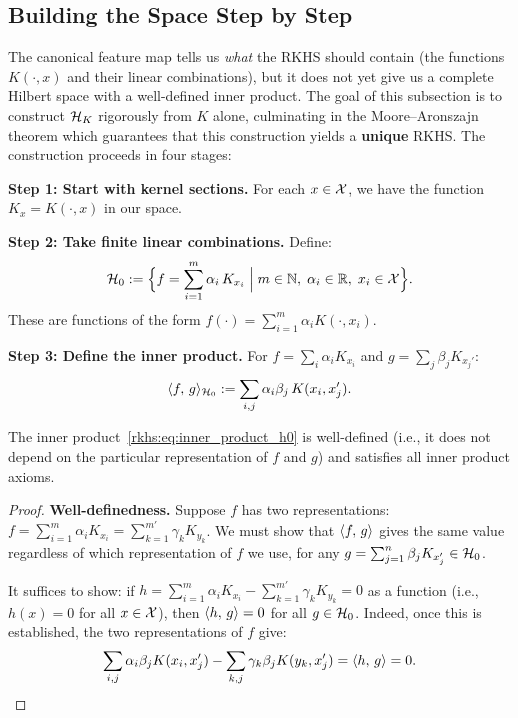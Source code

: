 \begin{notechapter}
\subsection{Building the Space Step by Step}
\label{rkhs:subsec:building_space}

The canonical feature map tells us \emph{what} the
RKHS should contain (the functions $K(\cdot, x)$ and
their linear combinations), but it does not yet give
us a complete Hilbert space with a well-defined inner
product. The goal of this subsection is to construct
$\mathcal{H}_K$ rigorously from $K$ alone, culminating in the
Moore--Aronszajn theorem which guarantees that this
construction yields a \textbf{unique} RKHS. The
construction proceeds in four stages:

\textbf{Step 1: Start with kernel sections.} For each $x \in \mathcal{X}$, we
have the function $K_x = K(\cdot, x)$ in our space.

\textbf{Step 2: Take finite linear combinations.} Define:
\[
\mathcal{H}_0 := \Bigl\{ f = \sum_{i=1}^m \alpha_i\, K_{x_i} \;\Big|\; m \in
\mathbb{N},\; \alpha_i \in \mathbb{R},\; x_i \in \mathcal{X} \Bigr\}.
\]
These are functions of the form $f(\cdot) = \sum_{i=1}^m \alpha_i
K(\cdot, x_i)$.

\textbf{Step 3: Define the inner product.} For $f = \sum_i \alpha_i
K_{x_i}$ and $g = \sum_j \beta_j K_{x_j'}$:
\begin{equation}
\label{rkhs:eq:inner_product_h0}
\langle f,\, g \rangle_{\mathcal{H}_0} := \sum_{i,j} \alpha_i \beta_j\, K(x_i, x_j').
\end{equation}

\begin{lemma}
\label{rkhs:lem:well_defined}
The inner product~\eqref{rkhs:eq:inner_product_h0} is well-defined (i.e., it
does not depend on the particular representation of $f$ and $g$) and
satisfies all inner product axioms.
\end{lemma}

\begin{proof}
\textbf{Well-definedness.} Suppose $f$ has two
representations:
$f = \sum_{i=1}^m \alpha_i K_{x_i}
   = \sum_{k=1}^{m'} \gamma_k K_{y_k}$.
We must show that $\langle f,\, g \rangle$ gives the same value
regardless of which representation of $f$ we use, for
any $g = \sum_{j=1}^n \beta_j K_{x_j'} \in \mathcal{H}_0$.

It suffices to show: if
$h = \sum_{i=1}^m \alpha_i K_{x_i}
   - \sum_{k=1}^{m'} \gamma_k K_{y_k} = 0$
as a function (i.e., $h(x) = 0$ for all $x \in \mathcal{X}$),
then $\langle h,\, g \rangle = 0$ for all $g \in \mathcal{H}_0$.
Indeed, once this is established, the two
representations of $f$ give:
\[
\sum_{i,j} \alpha_i \beta_j K(x_i, x_j')
- \sum_{k,j} \gamma_k \beta_j K(y_k, x_j')
= \langle h,\, g \rangle = 0.
\]


\end{proof}
\end{notechapter}
